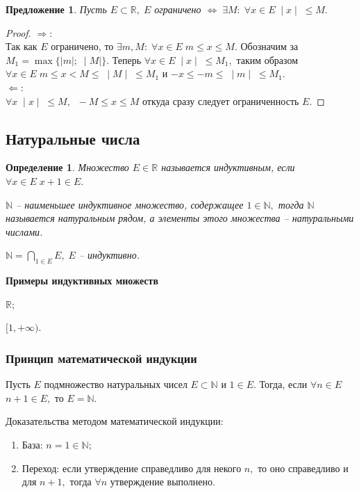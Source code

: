 \documentclass{article}
\newtheorem{Proposition}{Предложение}[section]
\newtheorem{Definition}{Определение}[section]
\begin{document}
\begin{Proposition}
Пусть $E\subset\mathbb{R}, \; E$ ограничено $\Leftrightarrow \; \exists M: \; \forall x\in E \; \mid x\mid\;\leq M.$
\end{Proposition}
\begin{proof}
$\Rightarrow:$\\
Так как $E$ ограничено, то $\exists m, M: \; \forall x\in E \; m\leq x\leq M.$ Обозначим за $M_1=\max\{\mid m\mid;\;\mid M\mid\}.$ Теперь $\forall x\in E \; \mid x\mid\;\leq M_1,$ таким образом $\forall x\in E \; m\leq x<M\leq\;\mid M\mid\;\leq M_1$ и $-x\leq-m\leq\;\mid m\mid\;\leq M_1.$ \\
$\Leftarrow:$\\
$\forall x \; \mid x\mid\;\leq M, \;\; -M\leq x\leq M$ откуда сразу следует ограниченность $E.$
\end{proof}
\subsection{Натуральные числа}
\begin{Definition}
Множество $E\in\mathbb{R}$ называется индуктивным, если $\forall x\in E \; x+1\in E.$

$\mathbb{N}$ -- наименьшее индуктивное множество, содержащее $1\in\mathbb{N},$ тогда $\mathbb{N}$ называется натуральным рядом, а элементы этого множества -- натуральными числами.

$\mathbb{N}=\bigcap\limits_{1\in E}E, \; E$ -- индуктивно. 
\end{Definition}

\par\medskip \textbf{Примеры индуктивных множеств}\par
$\mathbb{R};$

$[1, +\infty).$

\subsubsection{Принцип математической индукции}
Пусть $E$ подмножество натуральных чисел $E\subset\mathbb{N}$ и $1\in E.$ Тогда, если $\forall n\in E$\\ $n+1\in E,$ то $E=\mathbb{N}.$

Доказательства методом математической индукции:
\begin{enumerate}
\item База: $n=1\in\mathbb{N};$
\item Переход: если утверждение справедливо для некого $n,$ то оно справедливо и для $n+1,$ тогда $\forall n$ утверждение выполнено.
\end{enumerate}
\end{document}

